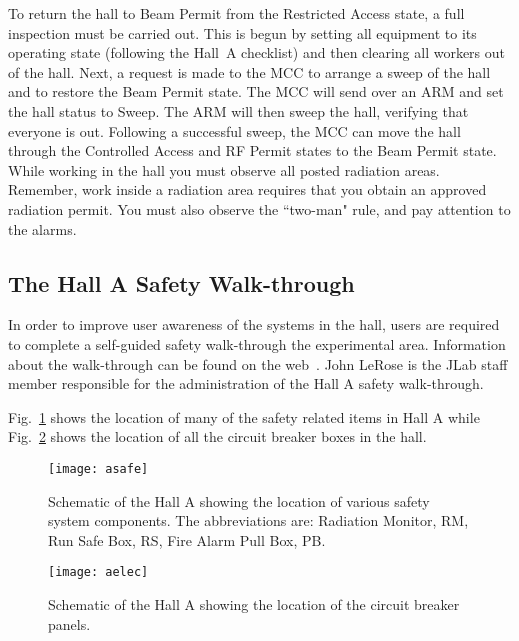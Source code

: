To return the hall to Beam Permit from the Restricted Access state, a
full inspection must be carried out. This is begun by setting all
equipment to its operating state (following the Hall~A checklist) and
then clearing all workers out of the hall. Next, a request is made to
the MCC to arrange a sweep of the hall and to restore the Beam Permit
state. The MCC will send over an ARM and set the hall status to Sweep.
The ARM will then sweep the hall, verifying that everyone is
out. Following a successful sweep, the MCC can move the hall through
the Controlled Access and RF Permit states to the Beam Permit state.
While working in the hall you must observe all posted radiation areas.
Remember, work inside a radiation area requires that you obtain an
approved radiation permit. You must also observe the ``two-man" rule,
and pay attention to the alarms.

\begin{safetyen}{10}{10}
\subsection{The Hall A Safety Walk-through}
\end{safetyen}

In order to improve user awareness of the systems in the hall,
users are required to complete a self-guided safety walk-through
the experimental area. Information about the walk-through can be
found on the web~\cite{SAThalla}.
John LeRose is the JLab staff member responsible for the
administration of the Hall A safety walk-through.

Fig.~\ref{fig:asafe} shows the location of
many of the safety related items in Hall A while
Fig.~\ref{fig:aelec} shows the location of all the circuit
breaker boxes in the hall.

\begin{figure}
\begin{center}
\texttt{[image: asafe]}
{\linespread{1.}
\caption[Introduction: Location of Hall Safety Items ]{Schematic
of the Hall A showing the location of various safety system
components. The abbreviations are: Radiation Monitor, RM, Run
Safe Box, RS, Fire Alarm Pull Box, PB. }
\label{fig:asafe}}
\end{center}
\end{figure}

\begin{figure}
\begin{center}
\texttt{[image: aelec]}
{\linespread{1.}
\caption[Introduction: Location of Circuit Breakers]{Schematic of
the Hall A showing the location of the circuit breaker panels.}
\label{fig:aelec}}
\end{center}
\end{figure}

